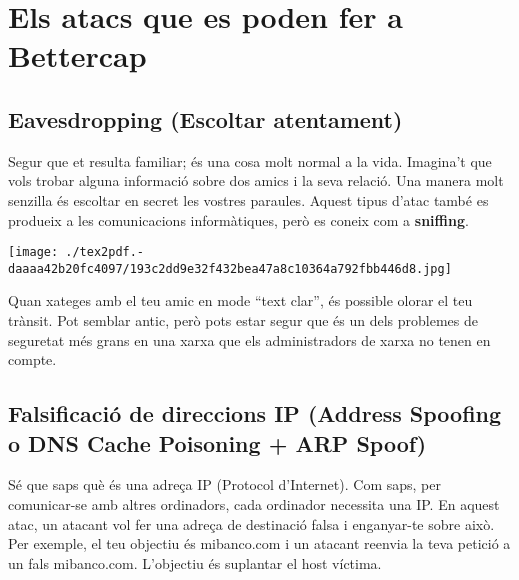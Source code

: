 \documentclass[]{article}
\begin{document}
\hypertarget{els-atacs-que-es-poden-fer-a-bettercap}{%
\section{\texorpdfstring{\textbf{Els atacs que es poden fer a
Bettercap}}{Els atacs que es poden fer a Bettercap}}\label{els-atacs-que-es-poden-fer-a-bettercap}}

\hypertarget{eavesdropping-escoltar-atentament}{%
\subsection{\texorpdfstring{\textbf{Eavesdropping (Escoltar
atentament)}}{Eavesdropping (Escoltar atentament)}}\label{eavesdropping-escoltar-atentament}}

Segur que et resulta familiar; és una cosa molt normal a la vida.
Imagina't que vols trobar alguna informació sobre dos amics i la seva
relació. Una manera molt senzilla és escoltar en secret les vostres
paraules. Aquest tipus d'atac també es produeix a les comunicacions
informàtiques, però es coneix com a \textbf{sniffing}.

\texttt{[image: ./tex2pdf.-daaaa42b20fc4097/193c2dd9e32f432bea47a8c10364a792fbb446d8.jpg]}

Quan xateges amb el teu amic en mode ``text clar'', és possible olorar
el teu trànsit. Pot semblar antic, però pots estar segur que és un dels
problemes de seguretat més grans en una xarxa que els administradors de
xarxa no tenen en compte.

\hypertarget{falsificaciuxf3-de-direccions-ip-address-spoofing-o-dns-cache-poisoning-arp-spoof}{%
\subsection{\texorpdfstring{\textbf{Falsificació de direccions IP
(Address Spoofing o DNS Cache Poisoning + ARP
Spoof)}}{Falsificació de direccions IP (Address Spoofing o DNS Cache Poisoning + ARP Spoof)}}\label{falsificaciuxf3-de-direccions-ip-address-spoofing-o-dns-cache-poisoning-arp-spoof}}

Sé que saps què és una adreça IP (Protocol d'Internet). Com saps, per
comunicar-se amb altres ordinadors, cada ordinador necessita una IP. En
aquest atac, un atacant vol fer una adreça de destinació falsa i
enganyar-te sobre això. Per exemple, el teu objectiu és mibanco.com i un
atacant reenvia la teva petició a un fals mibanco.com. L'objectiu és
suplantar el host víctima.
\end{document}
